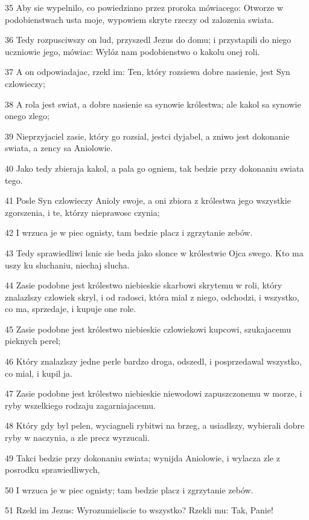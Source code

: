 \par 35 Aby sie wypelnilo, co powiedziano przez proroka mówiacego: Otworze w podobienstwach usta moje, wypowiem skryte rzeczy od zalozenia swiata.
\par 36 Tedy rozpusciwszy on lud, przyszedl Jezus do domu; i przystapili do niego uczniowie jego, mówiac: Wylóz nam podobienstwo o kakolu onej roli.
\par 37 A on odpowiadajac, rzekl im: Ten, który rozsiewa dobre nasienie, jest Syn czlowieczy;
\par 38 A rola jest swiat, a dobre nasienie sa synowie królestwa; ale kakol sa synowie onego zlego;
\par 39 Nieprzyjaciel zasie, który go rozsial, jestci dyjabel, a zniwo jest dokonanie swiata, a zency sa Aniolowie.
\par 40 Jako tedy zbieraja kakol, a pala go ogniem, tak bedzie przy dokonaniu swiata tego.
\par 41 Posle Syn czlowieczy Anioly swoje, a oni zbiora z królestwa jego wszystkie zgorszenia, i te, którzy nieprawosc czynia;
\par 42 I wrzuca je w piec ognisty, tam bedzie placz i zgrzytanie zebów.
\par 43 Tedy sprawiedliwi lsnic sie beda jako slonce w królestwie Ojca swego. Kto ma uszy ku sluchaniu, niechaj slucha.
\par 44 Zasie podobne jest królestwo niebieskie skarbowi skrytemu w roli, który znalazlszy czlowiek skryl, i od radosci, która mial z niego, odchodzi, i wszystko, co ma, sprzedaje, i kupuje one role.
\par 45 Zasie podobne jest królestwo niebieskie czlowiekowi kupcowi, szukajacemu pieknych perel;
\par 46 Który znalazlszy jedne perle bardzo droga, odszedl, i posprzedawal wszystko, co mial, i kupil ja.
\par 47 Zasie podobne jest królestwo niebieskie niewodowi zapuszczonemu w morze, i ryby wszelkiego rodzaju zagarniajacemu.
\par 48 Który gdy byl pelen, wyciagneli rybitwi na brzeg, a usiadlszy, wybierali dobre ryby w naczynia, a zle precz wyrzucali.
\par 49 Takci bedzie przy dokonaniu swiata; wynijda Aniolowie, i wylacza zle z posrodku sprawiedliwych,
\par 50 I wrzuca je w piec ognisty; tam bedzie placz i zgrzytanie zebów.
\par 51 Rzekl im Jezus: Wyrozumieliscie to wszystko? Rzekli mu: Tak, Panie!
